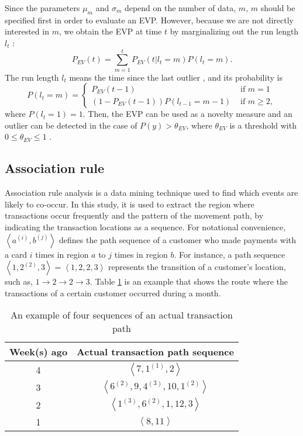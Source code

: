 \documentclass[final,authoryear,5p,times,twocolumn]{elsarticle}
\begin{document}
Since the parameters $\mu_m$ and $\sigma_m$ depend on the number of data, $m$, $m$ should be specified first in order to evaluate an EVP. However, because we are not directly interested in $m$, we obtain the EVP at time $t$ by marginalizing out the run length $l_t$ \citep{ref24}:
\begin{equation} \label{eq:EVP}
P_{EV}(t)=\sum_{m=1}^{t}P_{EV}(t|l_{t}=m)P(l_{t}=m).
\end{equation}
The run length $l_t$ means the time since the last outlier \citep{ref25}, and its probability \citep{ref24} is 
\[
P(l_t=m)=
\begin{cases}
P_{EV}(t-1) & \text{ if } m=1 \\ 
\left ( 1-P_{EV}(t-1) \right )P(l_{t-1}=m-1) & \text{ if } m \geq 2,
\end{cases}
\]
where $P(l_t=1)=1$. Then, the EVP can be used as a novelty measure and an outlier can be detected in the case of $P(y)>\theta_{EV}$, where $\theta_{EV}$ is a threshold with $0 \leq \theta_{EV} \leq 1$ \citep{ref24}.



\subsection{Association rule}
\label{section:Sec3.4}
Association rule analysis is a data mining technique used to find which events are likely to co-occur. In this study, it is used to extract the region where transactions occur frequently and the pattern of the movement path, by indicating the transaction locations as a sequence. For notational convenience, $\left \langle a^{(i)},b^{(j)} \right \rangle$ defines the path sequence of a customer who made payments with a card $i$ times in region $a$ to $j$ times in region $b$. For instance, a path sequence $\left \langle 1, 2^{(2)}, 3 \right \rangle=\left \langle 1,2,2,3 \right \rangle$ represents the transition of a customer's location, such as, $1\rightarrow 2\rightarrow 2\rightarrow 3$. Table \ref{tab:T1} is an example that shows the route where the transactions of a certain customer occurred during a month.
\begin{table}[h]
\begin{center}
    \begin{tabular}{c|c}
    Week(s) ago & Actual transaction path sequence                            \\ \hline
    4           & $\left \langle 7,1^{(1)},2 \right \rangle$                  \\
    3           & $\left \langle 6^{(2)},9,4^{(3)},10,1^{(2)} \right \rangle$ \\
    2           & $\left \langle 1^{(3)},6^{(2)},1,12,3 \right \rangle$       \\
    1           & $\left \langle 8,11 \right \rangle$                         \\
    \end{tabular}
    \caption {An example of four sequences of an actual transaction path}
    \label{tab:T1}
\end{center}
\end{table}
\end{document}
